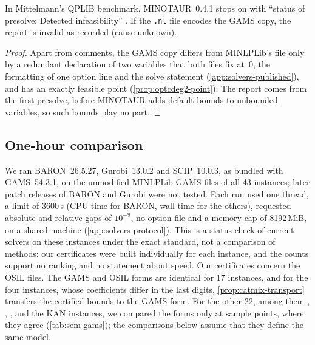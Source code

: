 \begin{proposition}\label{prop:minotaur-optcdeg2}
In Mittelmann's QPLIB benchmark, MINOTAUR~0.4.1 stops on  with ``status of presolve: Detected infeasibility'' \citep{mittelmann2026-continuous-non-convex-qplib-benchmark}.
If the \texttt{.nl} file encodes the GAMS copy, the report is invalid as recorded (cause unknown).
\end{proposition}

\begin{proof}
Apart from comments, the GAMS copy differs from MINLPLib's  file only by a redundant declaration of two variables that both files fix at~0, the formatting of one option line and the solve statement (\cref{app:solvers-published}), and  has an exactly feasible point (\cref{prop:optcdeg2-point}).
The report comes from the first presolve, before MINOTAUR adds default bounds to unbounded variables, so such bounds play no part.
\end{proof}

\subsection{One-hour comparison}\label{sec:solvers-campaign}

We ran BARON~26.5.27, Gurobi~13.0.2 and SCIP~10.0.3, as bundled with GAMS~54.3.1, on the unmodified MINLPLib GAMS files of all 43 instances; later patch releases of BARON and Gurobi were not tested.
Each run used one thread, a limit of 3600\,s (CPU time for BARON, wall time for the others), requested absolute and relative gaps of $10^{-9}$, no option file and a memory cap of 8192\,MiB, on a shared machine (\cref{app:solvers-protocol}).
This is a status check of current solvers on these instances under the exact standard, not a comparison of methods: our certificates were built individually for each instance, and the counts support no ranking and no statement about speed.
Our certificates concern the OSIL files.
The GAMS and OSIL forms are identical for 17 instances, and for the four  instances, whose coefficients differ in the last digits, \cref{prop:catmix-transport} transfers the certified bounds to the GAMS form.
For the other 22, among them , , ,  and the KAN instances, we compared the forms only at sample points, where they agree (\cref{tab:sem-gams}); the comparisons below assume that they define the same model.

